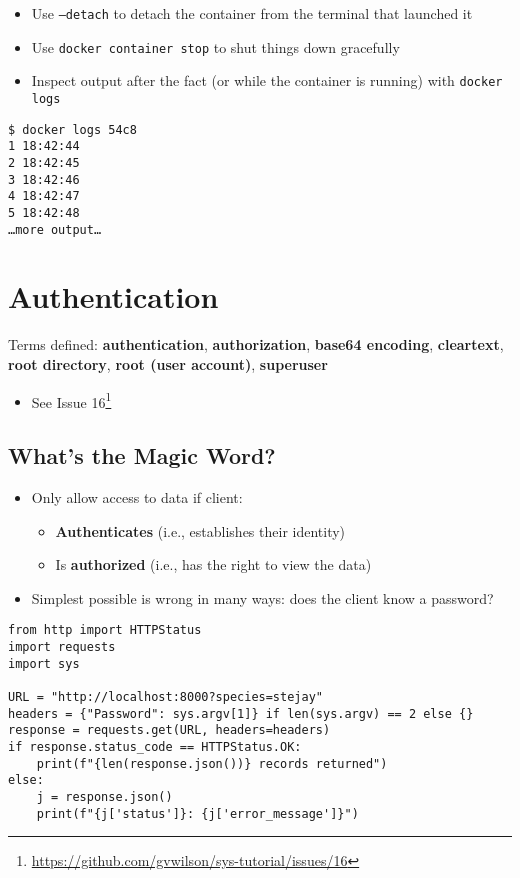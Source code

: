 \documentclass[krantzl]{krantz}
\newcommand{\glossref}[1]{\textbf{#1}}
\newcommand{\hreffoot}[2]{{#1}\footnote{\href{#2}{#2}}}
\begin{document}
\begin{itemize}
\item Use \texttt{--detach} to detach the container from the terminal that launched it

\item Use \texttt{docker container stop} to shut things down gracefully

\item Inspect output after the fact (or while the container is running) with \texttt{docker logs}

\end{itemize}
\begin{lstlisting}[frame=tblr,backgroundcolor=\color{black!5}]
$ docker logs 54c8
1 18:42:44
2 18:42:45
3 18:42:46
4 18:42:47
5 18:42:48
…more output…
\end{lstlisting}

\chapter{Authentication}\label{auth}




Terms defined: 
\glossref{authentication}, \glossref{authorization}, \glossref{base64 encoding}, \glossref{cleartext}, \glossref{root directory}, \glossref{root (user account)}, \glossref{superuser}


\begin{itemize}
\item See \hreffoot{Issue 16}{https://github.com/gvwilson/sys-tutorial/issues/16}

\end{itemize}
\section{What’s the Magic Word?}
\begin{itemize}
\item Only allow access to data if client:\begin{itemize}
\item \glossref{Authenticates} (i.e., establishes their identity)

\item Is \glossref{authorized} (i.e., has the right to view the data)

\end{itemize}


\item Simplest possible is wrong in many ways: does the client know a password?

\end{itemize}
\begin{lstlisting}[frame=tblr]
from http import HTTPStatus
import requests
import sys

URL = "http://localhost:8000?species=stejay"
headers = {"Password": sys.argv[1]} if len(sys.argv) == 2 else {}
response = requests.get(URL, headers=headers)
if response.status_code == HTTPStatus.OK:
    print(f"{len(response.json())} records returned")
else:
    j = response.json()
    print(f"{j['status']}: {j['error_message']}")
\end{lstlisting}
\end{document}
